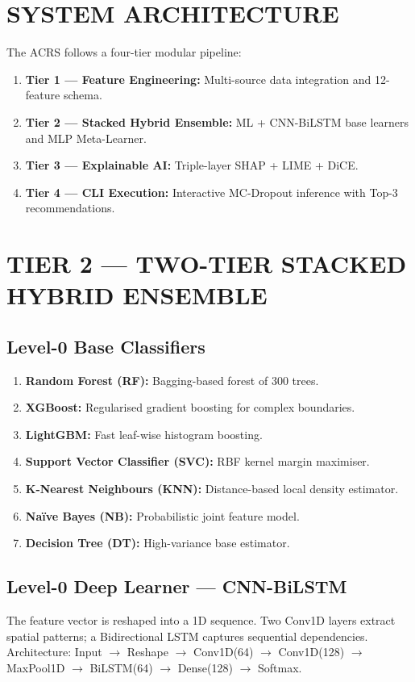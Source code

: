 \documentclass[12pt,a4paper,oneside]{report}
\begin{document}
\section{SYSTEM ARCHITECTURE}

The ACRS follows a four-tier modular pipeline:

\begin{enumerate}[leftmargin=*, label=\arabic*.]
  \item \textbf{Tier 1 --- Feature Engineering:} Multi-source data integration and 12-feature schema.
  \item \textbf{Tier 2 --- Stacked Hybrid Ensemble:} ML + CNN-BiLSTM base learners and MLP Meta-Learner.
  \item \textbf{Tier 3 --- Explainable AI:} Triple-layer SHAP + LIME + DiCE.
  \item \textbf{Tier 4 --- CLI Execution:} Interactive MC-Dropout inference with Top-3 recommendations.
\end{enumerate}

\section{TIER 2 --- TWO-TIER STACKED HYBRID ENSEMBLE}

\subsection{Level-0 Base Classifiers}
\begin{enumerate}[leftmargin=*, label=\arabic*.]
  \item \textbf{Random Forest (RF):} Bagging-based forest of 300 trees.
  \item \textbf{XGBoost:} Regularised gradient boosting for complex boundaries.
  \item \textbf{LightGBM:} Fast leaf-wise histogram boosting.
  \item \textbf{Support Vector Classifier (SVC):} RBF kernel margin maximiser.
  \item \textbf{K-Nearest Neighbours (KNN):} Distance-based local density estimator.
  \item \textbf{Na\"{i}ve Bayes (NB):} Probabilistic joint feature model.
  \item \textbf{Decision Tree (DT):} High-variance base estimator.
\end{enumerate}

\subsection{Level-0 Deep Learner --- CNN-BiLSTM}
The feature vector is reshaped into a 1D sequence. Two Conv1D layers extract spatial patterns; a Bidirectional LSTM captures sequential dependencies. Architecture: Input $\rightarrow$ Reshape $\rightarrow$ Conv1D(64) $\rightarrow$ Conv1D(128) $\rightarrow$ MaxPool1D $\rightarrow$ BiLSTM(64) $\rightarrow$ Dense(128) $\rightarrow$ Softmax.
\end{document}
